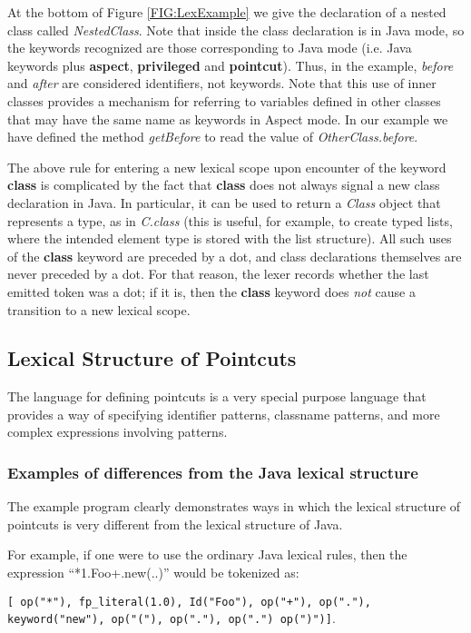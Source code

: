 At the bottom of Figure \ref{FIG:LexExample} we give the declaration of
a nested class called {\em NestedClass}.   Note that inside the class
declaration is in {\sc Java} mode,  so the keywords recognized are those
corresponding to {\sc Java} mode (i.e. Java keywords plus {\bf aspect},
{\bf privileged} and {\bf pointcut}).    Thus, in the example,  
{\em before} and {\em after} are considered identifiers, not keywords.   
Note that this use of
inner classes provides a mechanism for referring to variables defined
in other classes that may have the same name as keywords in 
{\sc Aspect} mode.  In our example we have defined the method
{\em getBefore} to read the value of {\em OtherClass.before}.

The above rule for entering a new lexical scope upon encounter of
the keyword {\bf class} is complicated by the fact that {\bf class}
does not always signal a new class declaration in Java. In particular,
it can be used to return a {\em Class} object that represents a type,
as in {\em C.class} (this is useful, for example, to create typed lists, 
where the intended element type is stored with the list structure).
All such uses of the {\bf class} keyword are preceded by a
dot, and class declarations themselves are never preceded by a dot. 
For that reason, the lexer records whether the last emitted token
was a dot; if it is, then the {\bf class} keyword does {\em not}
cause a transition to a new lexical scope.

\subsection{Lexical Structure of Pointcuts}

The language for defining pointcuts is a very special purpose
language that provides a way of specifying identifier patterns,
classname patterns, and more complex expressions involving
patterns.     

\subsubsection{Examples of differences from the Java lexical structure}
The example program clearly demonstrates ways in which the
lexical structure of pointcuts is very different from the 
lexical structure of Java.

For example, if one were to use the ordinary Java
lexical rules, then the expression ``*1.Foo+.new(..)'' 
would be tokenized as:

{\tt[ op("*"), fp\_literal(1.0), Id("Foo"), op("+"), op("."),  
keyword("new"), op("("), op("."), op(".") op(")")]}.  

